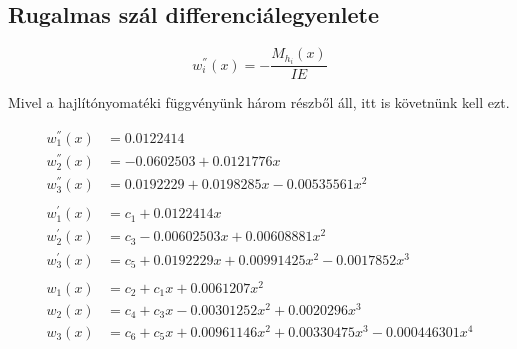 \subsection{Rugalmas szál differenciálegyenlete}
\begin{equation*}
	w_i^{''}(x) = -\frac{M_{h_i}(x)}{IE}
\end{equation*}

Mivel a hajlítónyomatéki függvényünk három részből áll, itt is követnünk kell ezt.

\begin{align*}
	w_1^{''}(x) &= 0.0122414 \\
	w_2^{''}(x) &= -0.0602503 + 0.0121776x \\
	w_3^{''}(x) &= 0.0192229 + 0.0198285x - 0.00535561x^2 \\ \\
	w_1^{'}(x) &= c_1 + 0.0122414x \\
	w_2^{'}(x) &= c_3  -0.00602503x + 0.00608881x^2 \\
	w_3^{'}(x) &= c_5 + 0.0192229x+0.00991425x^2-0.0017852x^3 \\ \\
	w_1(x) &= c_2 + c_1 x + 0.0061207x^2 \\
	w_2(x) &= c_4 + c_3 x - 0.00301252x^2 + 0.0020296x^3 \\
	w_3(x) &= c_6 + c_5 x + 0.00961146x^2 + 0.00330475x^3 - 0.000446301x^4
\end{align*}

\pgfmathsetmacro{}
\pgfmathsetmacro{}
\pgfmathsetmacro{}
\pgfmathsetmacro{}
\pgfmathsetmacro{}
\pgfmathsetmacro{}

\begin{center}
\end{center}


